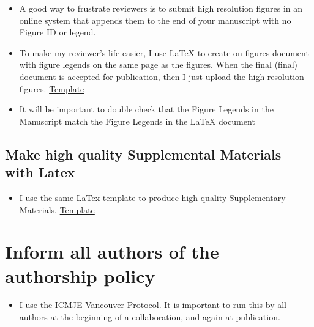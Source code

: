 \documentclass[
  letterpaper,
  DIV=11,
  numbers=noendperiod]{scrreprt}
\providecommand{\tightlist}{%
  \setlength{\itemsep}{0pt}\setlength{\parskip}{0pt}}\usepackage{longtable,booktabs,array}
\begin{document}
\begin{itemize}
\item
  A good way to frustrate reviewers is to submit high resolution figures
  in an online system that appends them to the end of your manuscript
  with no Figure ID or legend.
\item
  To make my reviewer's life easier, I use LaTeX to create on figures
  document with figure legends on the same page as the figures. When the
  final (final) document is accepted for publication, then I just upload
  the high resolution figures.
  \href{https://drive.google.com/drive/folders/1mbvkizpPnM4CjkTTj2ARENtEqDwhXYDU?usp=sharing}{Template}
\item
  It will be important to double check that the Figure Legends in the
  Manuscript match the Figure Legends in the LaTeX document
\end{itemize}

\hypertarget{make-high-quality-supplemental-materials-with-latex}{%
\subsection*{\texorpdfstring{\textbf{Make high quality Supplemental
Materials with
Latex}}{Make high quality Supplemental Materials with Latex}}\label{make-high-quality-supplemental-materials-with-latex}}

\begin{itemize}
\tightlist
\item
  I use the same LaTex template to produce high-quality Supplementary
  Materials.
  \href{https://drive.google.com/drive/folders/1mbvkizpPnM4CjkTTj2ARENtEqDwhXYDU?usp=sharing}{Template}
\end{itemize}

\hypertarget{inform-all-authors-of-the-authorship-policy}{%
\section*{\texorpdfstring{\textbf{Inform all authors of the authorship
policy}}{Inform all authors of the authorship policy}}\label{inform-all-authors-of-the-authorship-policy}}


\begin{itemize}
\tightlist
\item
  I use the
  \href{http://www.icmje.org/recommendations/browse/roles-and-responsibilities/defining-the-role-of-authors-and-contributors.html}{ICMJE
  Vancouver Protocol}. It is important to run this by all authors at the
  beginning of a collaboration, and again at publication.
\end{itemize}
\end{document}
